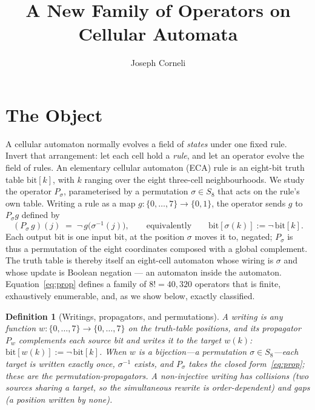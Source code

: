 \documentclass[man,12pt,floatsintext]{apa7}
\title{A New Family of Operators on Cellular Automata}
\author{Joseph Corneli}
\affiliation{}
\newcommand{\sig}{\sigma}
\newcommand{\bit}[1]{\mathrm{bit}[#1]}
\newtheorem{definition}{Definition}
\begin{document}
\maketitle

\section{The Object}
\label{sec:object}

A cellular automaton normally evolves a field of \emph{states} under one
fixed rule. Invert that arrangement: let each cell hold a \emph{rule}, and
let an operator evolve the field of rules. An elementary cellular automaton
(ECA) rule is an eight-bit truth table $\bit{k}$, with $k$ ranging over the
eight three-cell neighbourhoods. We study the operator $P_\sig$, parameterised by a
permutation $\sig \in S_8$ that acts on the rule's own table. Writing a rule
as a map $g\colon \{0,\dots,7\} \to \{0,1\}$, the operator sends $g$ to
$P_\sig g$ defined by
\begin{equation}
(P_\sig\, g)(j) \;=\; \lnot\, g\bigl(\sig^{-1}(j)\bigr),
\qquad\text{equivalently}\qquad \bit{\sig(k)} := \lnot\,\bit{k}.
\label{eq:prop}
\end{equation}
Each output bit is one input bit, at the position $\sig$ moves it to, negated;
$P_\sig$ is thus a permutation of the eight coordinates composed with a global
complement. The truth table is thereby itself an eight-cell automaton whose
wiring is $\sig$ and whose update is Boolean negation --- an automaton inside
the automaton. Equation~\eqref{eq:prop} defines a family of $8! = 40{,}320$
operators that is finite, exhaustively enumerable, and, as we show below,
exactly classified.

\begin{definition}[Writings, propagators, and permutations]\label{def:writing}
A \emph{writing} is any function $w\colon\{0,\dots,7\}\to\{0,\dots,7\}$ on the
truth-table positions, and its \emph{propagator} $P_w$ complements each source
bit and writes it to the target $w(k)$: $\bit{w(k)} := \lnot\,\bit{k}$. When $w$
is a bijection---a permutation $\sig\in S_8$---each target is written exactly
once, $\sig^{-1}$ exists, and $P_\sig$ takes the closed form~\eqref{eq:prop};
these are the \emph{permutation-propagators}. A non-injective writing has
\emph{collisions} (two sources sharing a target, so the simultaneous rewrite is
order-dependent) and \emph{gaps} (a position written by none).
\end{definition}
\end{document}
